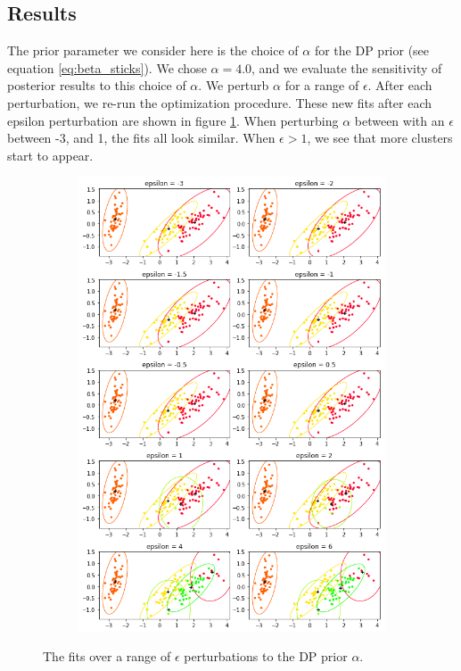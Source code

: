 \documentclass[a4paper]{article}
\begin{document}
\subsection{Results}
The prior parameter we consider here is the choice of $\alpha$ for the DP prior (see equation \ref{eq:beta_sticks}).
We chose $\alpha = 4.0$, and we evaluate the sensitivity of posterior results to this choice of
$\alpha$. We perturb $\alpha$ for a range of $\epsilon$. After each perturbation,
we re-run the optimization procedure. These new fits after each epsilon perturbation are shown in
figure \ref{fig:vary_alpha_fits}. When perturbing $\alpha$ between with an $\epsilon$ between
-3, and 1, the fits all look similar. When $\epsilon > 1$, we see that more clusters start to appear.

\begin{figure}[h!]
	\centering
	\begin{subfigure}[t]{0.6\textwidth}
		\includegraphics[width = \textwidth]{./parametric_sensitivity_figs/sensitivity_datapoints.png}
	\end{subfigure}
	\caption{The fits over a range of $\epsilon$ perturbations to the DP prior $\alpha$. }
	\label{fig:vary_alpha_fits}
\end{figure}
\end{document}
